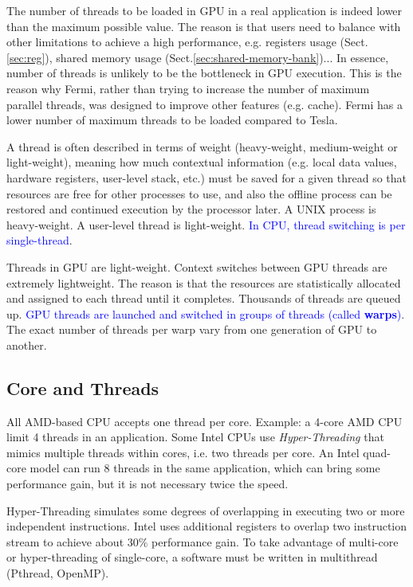 The number of threads to be loaded in GPU in a real application is indeed  lower
than the maximum possible value. The reason is that users need to  balance with
other limitations to achieve a high performance, e.g.   registers usage
(Sect.\ref{sec:reg}), shared memory usage 
(Sect.\ref{sec:shared-memory-bank})...  In essence, number of threads is
unlikely to be the bottleneck in GPU  execution. This is the reason why Fermi,
rather than trying to increase the  number of maximum parallel threads, was
designed to improve other features (e.g. cache). Fermi has a lower number of
maximum threads to be loaded compared to  Tesla.

\begin{framed}
A thread is often described in terms of weight (heavy-weight, medium-weight or
light-weight), meaning how much contextual information (e.g. local data
values, hardware registers, user-level stack, etc.) must be saved for a given
thread so that resources are free for other processes to use, and also the
offline process can be restored and continued execution by the processor later.
A UNIX process is heavy-weight. A user-level thread is light-weight.
\textcolor{blue}{In CPU, thread switching is per single-thread}.

Threads in GPU are light-weight. Context switches between GPU threads are
extremely lightweight. The reason is that the resources are statistically
allocated and assigned to each thread until it completes. Thousands of threads
are queued up. \textcolor{blue}{GPU threads are launched and switched in
groups of threads (called {\bf warps})}. The exact number of threads per warp
vary from one generation of GPU to another. 
\end{framed}


\subsection{Core and Threads}
\label{sec:core-thread}

All AMD-based CPU accepts one thread per core. Example: a 4-core AMD CPU limit 4
threads in an application. Some Intel CPUs use {\it
Hyper-Threading} that mimics multiple threads within cores, i.e. two threads per
core. An Intel quad-core model can run 8 threads in the same application, which
can bring some performance gain, but it is not necessary twice the speed. 

Hyper-Threading simulates some degrees of overlapping in executing two or more
independent instructions. Intel uses additional registers to overlap two
instruction stream to achieve about 30\% performance gain. To take advantage of
multi-core or hyper-threading of single-core, a software must be written in
multithread (Pthread, OpenMP).

